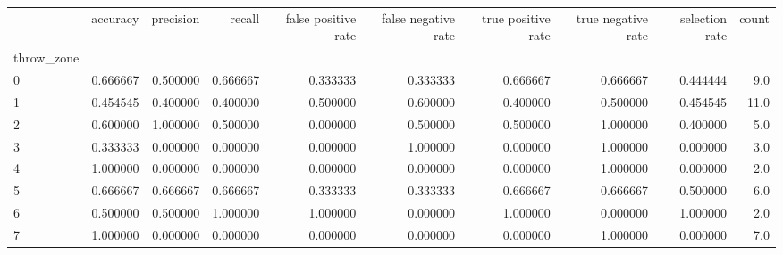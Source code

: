 \begin{tabular}{lrrrrrrrrr}
\toprule
{} &  accuracy &  precision &    recall &  false positive rate &  false negative rate &  true positive rate &  true negative rate &  selection rate &  count \\
throw\_zone &           &            &           &                      &                      &                     &                     &                 &        \\
\midrule
0          &  0.666667 &   0.500000 &  0.666667 &             0.333333 &             0.333333 &            0.666667 &            0.666667 &        0.444444 &    9.0 \\
1          &  0.454545 &   0.400000 &  0.400000 &             0.500000 &             0.600000 &            0.400000 &            0.500000 &        0.454545 &   11.0 \\
2          &  0.600000 &   1.000000 &  0.500000 &             0.000000 &             0.500000 &            0.500000 &            1.000000 &        0.400000 &    5.0 \\
3          &  0.333333 &   0.000000 &  0.000000 &             0.000000 &             1.000000 &            0.000000 &            1.000000 &        0.000000 &    3.0 \\
4          &  1.000000 &   0.000000 &  0.000000 &             0.000000 &             0.000000 &            0.000000 &            1.000000 &        0.000000 &    2.0 \\
5          &  0.666667 &   0.666667 &  0.666667 &             0.333333 &             0.333333 &            0.666667 &            0.666667 &        0.500000 &    6.0 \\
6          &  0.500000 &   0.500000 &  1.000000 &             1.000000 &             0.000000 &            1.000000 &            0.000000 &        1.000000 &    2.0 \\
7          &  1.000000 &   0.000000 &  0.000000 &             0.000000 &             0.000000 &            0.000000 &            1.000000 &        0.000000 &    7.0 \\
\bottomrule
\end{tabular}
